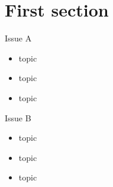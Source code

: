\section{First section}

\begin{frame}[t]{Issue A}
\begin{itemize}
\item topic
\item topic
\item topic
\end{itemize}
\end{frame}

\begin{frame}[t]{Issue B}
\begin{itemize}
\item topic
\item topic
\item topic
\end{itemize}
\end{frame}

